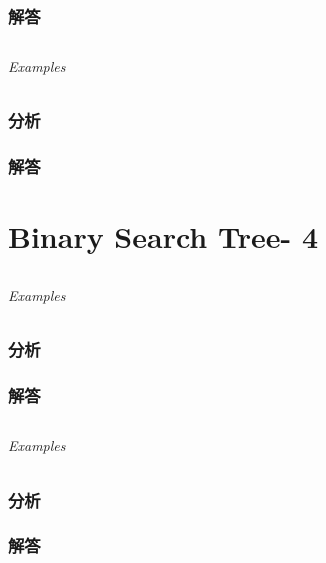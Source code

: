 \documentclass[UTF8,a4paper,12pt]{ctexbook}
\begin{document}
	\subsection{解答}
	
\section{}
	
	\subparagraph{Examples}
	
	\subsection{分析}
	
	\subsection{解答}
\chapter{Binary Search Tree- 4}
\section{}
	
	\subparagraph{Examples}
	
	\subsection{分析}
	
	\subsection{解答}
	
\section{}
	
	\subparagraph{Examples}
	
	\subsection{分析}
	
	\subsection{解答}
	
\section{}
	
\end{document}
